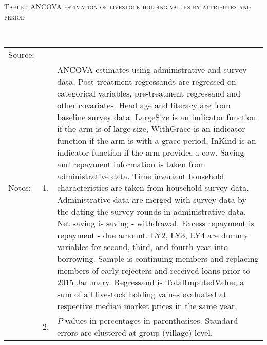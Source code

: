 \hspace{-1cm}\begin{minipage}[t]{14cm}
\hfil\textsc{\normalsize Table \thetable: ANCOVA estimation of livestock holding values by attributes and period\label{tab ANCOVA livestock timevarying attributes}}\\
\setlength{\tabcolsep}{1pt}
\setlength{\baselineskip}{8pt}
\renewcommand{\arraystretch}{.55}
\hfil{}\\
\renewcommand{\arraystretch}{.8}
\setlength{\tabcolsep}{1pt}
\begin{tabular}{>{\hfill\scriptsize}p{1cm}<{}>{\hfill\scriptsize}p{.25cm}<{}>{\scriptsize}p{12cm}<{\hfill}}
Source:& \multicolumn{2}{l}{\scriptsize Estimated with GUK administrative and survey data.}\\
Notes: & 1. & ANCOVA estimates using administrative and survey data. Post treatment regressands are regressed on categorical variables, pre-treatment regressand and other covariates. Head age and literacy are from baseline survey data.  \textsf{LargeSize} is an indicator function if the arm is of large size, \textsf{WithGrace} is an indicator function if the arm is with a grace period, \textsf{InKind} is an indicator function if the arm provides a cow. Saving and repayment information is taken from administrative data. Time invariant household characteristics are taken from household survey data. Administrative data are merged with survey data by the dating the survey rounds in administrative data. Net saving is saving - withdrawal. Excess repayment is repayment - due amount. \textsf{LY2, LY3, LY4} are dummy variables for second, third, and 	fourth year into borrowing. Sample is continuing members and replacing members of early rejecters and received loans prior to 2015 Janunary. Regressand is \textsf{TotalImputedValue}, a sum of all livestock holding values evaluated at respective median market prices in the same year. \\
& 2. & $P$ values in percentages in parenthesises. Standard errors are clustered at group (village) level.
\end{tabular}
\end{minipage}


